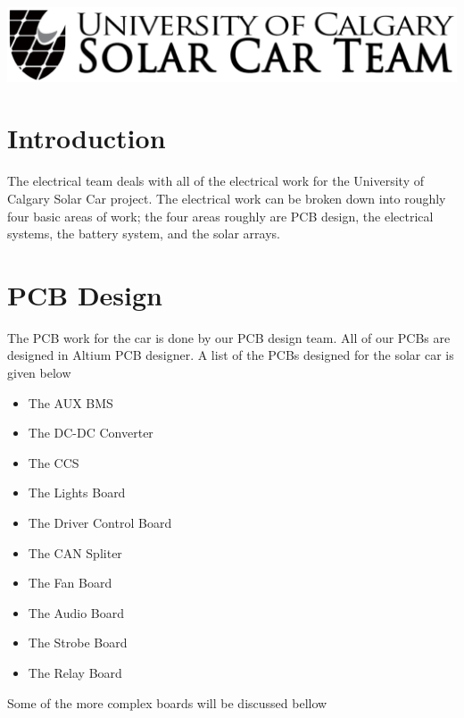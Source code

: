 \documentclass{article}
\begin{document}
\begin{titlepage}
	    \includegraphics[width=\textwidth]{images/logo.png}\\[1cm] %
	     
	    
	    \vfill %
  
	\end{titlepage}

    \section{Introduction}
    The electrical team deals with all of the electrical work for the
    University of Calgary Solar Car project. The electrical work can be
    broken down into roughly four basic areas of work; the four areas
    roughly are PCB design, the electrical systems, the battery system,
    and the solar arrays. 
    \section{PCB Design}
    The PCB work for the car is done by our PCB design team. All of our
    PCBs are designed in Altium PCB designer. A list of the PCBs 
    designed for the solar car is given below
    \begin{itemize}
        \item The AUX BMS
        \item The DC-DC Converter
        \item The CCS
        \item The Lights Board
        \item The Driver Control Board
        \item The CAN Spliter
        \item The Fan Board
        \item The Audio Board
        \item The Strobe Board
        \item The Relay Board
    \end{itemize}
    Some of the more complex boards will be discussed bellow
\end{document}
